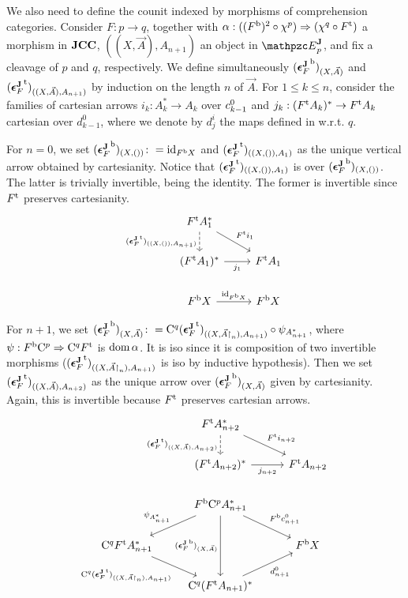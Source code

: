 \documentclass{lmcs} %
\theoremstyle{plain}\newtheorem{satz}[thm]{Satz} %
\begin{document}
			We also need to define the counit indexed by morphisms of comprehension categories. Consider $F:p\to q$, together with $\alpha:(({F}^{\mathrm{b}})^{2}\circ \chi^{p})\Rightarrow (\chi^{q}\circ {F}^{\mathrm{t}})$ a morphism in $\mathbf{JCC}$, $((X,\vec{A}), A_{n+1})$ an object in $\JDomE{p}$, and fix a cleavage of $p$ and $q$, respectively. We define simultaneously $({\boldsymbol{\epsilon}^{\mathbf{J}}_{F}}^{\mathrm{b}})_{(X,\vec{A})}$ and $({\boldsymbol{\epsilon}^{\mathbf{J}}_{F}}^{\mathrm{t}})_{((X,\vec{A}), A_{n+1})}$ by induction on the length $n$ of $\vec{A}$. For $1\leq k\leq n$, consider the families of cartesian arrows $i_k:A_k^*\to A_k$ over $c^{0}_{k-1}$ and $j_k:({F}^{\mathrm{t}}A_{k})^*\to {F}^{\mathrm{t}}A_k$ cartesian over $d^0_{k-1}$, where we denote by $d^i_j$ the maps defined in  w.r.t. $q$. 
			
			For $n=0$, we set $({\boldsymbol{\epsilon}^{\mathbf{J}}_{F}}^{\mathrm{b}})_{(X,())}\colon=\mathrm{id}_{{F}^{\mathrm{b}}X}$ and $({\boldsymbol{\epsilon}^{\mathbf{J}}_{F}}^{\mathrm{t}})_{((X,()), A_{1})}$ as the unique vertical arrow obtained by cartesianity. Notice that $({\boldsymbol{\epsilon}^{\mathbf{J}}_{F}}^{\mathrm{t}})_{((X,()), A_{1})}$ is over $({\boldsymbol{\epsilon}^{\mathbf{J}}_{F}}^{\mathrm{b}})_{(X,())}$. The latter is trivially invertible, being the identity. The former is invertible since ${F}^{\mathrm{t}}$ preserves cartesianity.
			\[\begin{tikzcd}
				{\ft{F}A_1^*} \\
				{(\ft{F}A_1)^*} & {\ft{F}A_1} \\
				{\fb{F}X} & {\fb{F}X}
				\arrow["{(\ft{\Jcoun{F}})_{((X,()), A_{n+1})}}"', dashed, from=1-1, to=2-1]
				\arrow["{\ft{F}i_1}", from=1-1, to=2-2]
				\arrow["{j_1}"', from=2-1, to=2-2]
				\arrow["{\id{\fb{F}X}}", from=3-1, to=3-2]
			\end{tikzcd}\]
				
			For $n+1$, we set $({\boldsymbol{\epsilon}^{\mathbf{J}}_{F}}^{\mathrm{b}})_{(X,\vec{A})}\colon=\mathrm{C}^{q}({\boldsymbol{\epsilon}^{\mathbf{J}}_{F}}^{\mathrm{t}})_{((X,\vec{A}\mathord{\restriction}_n), A_{n+1})}\circ\psi_{A_{n+1}^*}$, where $\psi:{F}^{\mathrm{b}}\mathrm{C}^{p}\Rightarrow\mathrm{C}^{q}{F}^{\mathrm{t}}$ is $\mathop{\mathrm{dom}}\nolimits\alpha$. It is iso since it is composition of two invertible morphisms ($({\boldsymbol{\epsilon}^{\mathbf{J}}_{F}}^{\mathrm{t}})_{((X,\vec{A}\mathord{\restriction}_n), A_{n+1})}$ is iso by inductive hypothesis). Then we set $({\boldsymbol{\epsilon}^{\mathbf{J}}_{F}}^{\mathrm{t}})_{((X,\vec{A}), A_{n+2})}$ as the unique arrow over $({\boldsymbol{\epsilon}^{\mathbf{J}}_{F}}^{\mathrm{b}})_{(X,\vec{A})}$ given by cartesianity. Again, this is invertible because ${F}^{\mathrm{t}}$ preserves cartesian arrows.
			\[\begin{tikzcd}
				& {\ft{F}A_{n+2}^*} \\
				& {(\ft{F}A_{n+2})^*} & {\ft{F}A_{n+2}} \\
				& {\fb{F}\comp{p}A_{n+1}^*} \\
				{\comp{q}\ft{F}A_{n+1}^*} && {\fb{F}X} \\
				& {\comp{q}(\ft{F}A_{n+1})^*}
				\arrow["{{(\ft{\Jcoun{F}})_{((X,\vec{A}), A_{n+2})}}}"', dashed, from=1-2, to=2-2]
				\arrow["{{\ft{F}i_{n+2}}}", from=1-2, to=2-3]
				\arrow["{{j_{n+2}}}"', from=2-2, to=2-3]
				\arrow["\psi_{A_{n+1}^*}"', from=3-2, to=4-1]
				\arrow["{{\fb{F}\C{0}{n+1}}}", from=3-2, to=4-3]
				\arrow["{{(\fb{\Jcoun{F}})_{(X,\vec{A})}}}"', from=3-2, to=5-2]
				\arrow["{{\comp{q}(\ft{\Jcoun{F}})_{((X,\vec{A}\rstn_n), A_{n+1})}}}"', from=4-1, to=5-2]
				\arrow["{{d^0_{n+1}}}"', from=5-2, to=4-3]
			\end{tikzcd}\]
			
\end{document}
